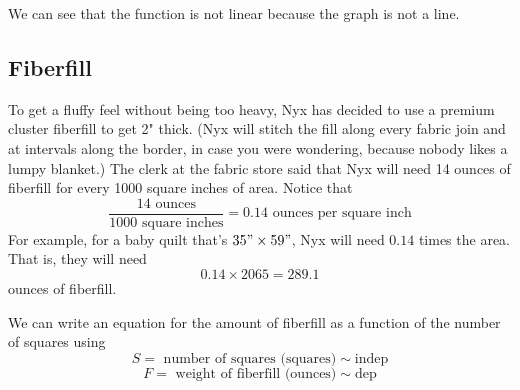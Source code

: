 \begin{center}
\end{center}

We can see that the function is not linear because the graph is not a line.

\subsection*{Fiberfill}

To get a fluffy feel without being too heavy, Nyx has decided to use a premium cluster fiberfill to get 2" thick.  (Nyx will stitch the fill along every fabric join and at intervals along the border, in case you were wondering, because nobody likes a lumpy blanket.)  The clerk at the fabric store said that Nyx will need 14 ounces of fiberfill for 
every 1000 square inches of area.  Notice that $$\frac{14 \text{ ounces}}{1000 \text{ square inches}} = 0.14 \text{ ounces per square inch}$$
For example, for a baby quilt that's $35" \times 59"$, Nyx will need $0.14$ times the area.  That is, they will need $$0.14 \times2065 = 289.1$$ ounces of fiberfill.

We can write an equation for the amount of fiberfill as a function of the number of squares using 
    $$S = \text{ number of squares (squares)} \sim \text{indep}$$
    $$F = \text{ weight of fiberfill (ounces)} \sim \text{dep}$$

